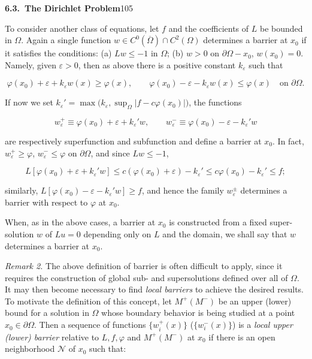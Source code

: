 
\setcounter{section}{6}
\setcounter{subsection}{2}
\noindent\textbf{6.3.\ The Dirichlet Problem}\hfill 105

\medskip

\noindent To consider another class of equations, let $f$ and the coefficients of $L$ be bounded in $\Omega$. Again a single function $w \in C^0(\overline{\Omega}) \cap C^2(\Omega)$ determines a barrier at $x_0$ if it satisfies the conditions: (a) $Lw \leq -1$ in $\Omega$; (b) $w > 0$ on $\partial\Omega - x_0$, $w(x_0)=0$. Namely, given $\varepsilon > 0$, then as above there is a positive constant $k_\varepsilon$ such that

\[
\varphi(x_0)+\varepsilon+k_\varepsilon w(x)\geq \varphi(x), \qquad
\varphi(x_0)-\varepsilon-k_\varepsilon w(x)\leq \varphi(x) \quad \text{on } \partial\Omega.
\]

\noindent If now we set $k_\varepsilon'=\max\bigl(k_\varepsilon,\sup_\Omega |f-c\varphi(x_0)|\bigr)$, the functions

\[
w_\varepsilon^+ \equiv \varphi(x_0)+\varepsilon+k_\varepsilon' w, \qquad
w_\varepsilon^- \equiv \varphi(x_0)-\varepsilon-k_\varepsilon' w
\]

\noindent are respectively superfunction and subfunction and define a barrier at $x_0$. In fact, $w_\varepsilon^+ \geq \varphi$, $w_\varepsilon^- \leq \varphi$ on $\partial\Omega$, and since $Lw \leq -1$,

\[
L[\varphi(x_0)+\varepsilon+k_\varepsilon' w]\leq c(\varphi(x_0)+\varepsilon)-k_\varepsilon' \leq c\varphi(x_0)-k_\varepsilon' \leq f;
\]

\noindent similarly, $L[\varphi(x_0)-\varepsilon-k_\varepsilon' w]\geq f$, and hence the family $w_\varepsilon^\pm$ determines a barrier with respect to $\varphi$ at $x_0$.

\noindent When, as in the above cases, a barrier at $x_0$ is constructed from a fixed super-solution $w$ of $Lu=0$ depending only on $L$ and the domain, we shall say that $w$ determines a barrier at $x_0$.

\medskip

\noindent\textit{Remark 2.} \quad The above definition of barrier is often difficult to apply, since it requires the construction of global sub- and supersolutions defined over all of $\Omega$. It may then become necessary to find \textit{local barriers} to achieve the desired results. To motivate the definition of this concept, let $M^+(M^-)$ be an upper (lower) bound for a solution in $\Omega$ whose boundary behavior is being studied at a point $x_0 \in \partial\Omega$. Then a sequence of functions $\{w_i^+(x)\}$ ($\{w_i^-(x)\}$) is a \textit{local upper (lower) barrier} relative to $L,f,\varphi$ and $M^+(M^-)$ at $x_0$ if there is an open neighborhood $\mathcal N$ of $x_0$ such that:

